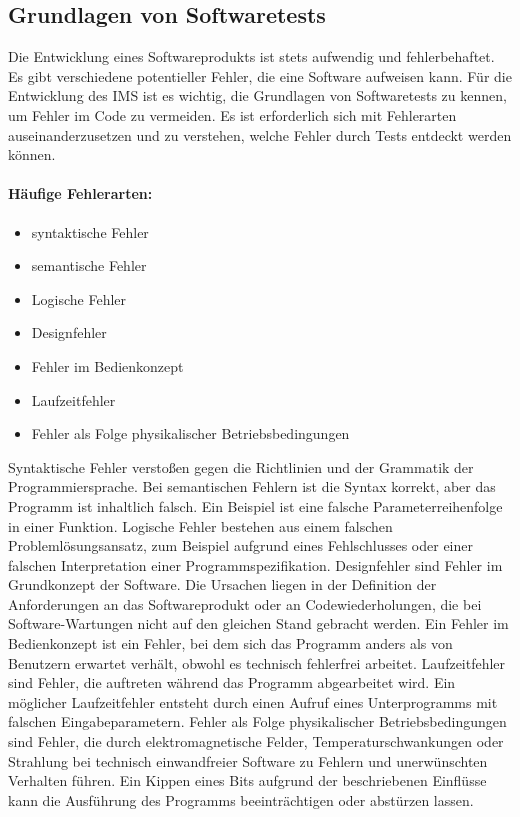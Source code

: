 \documentclass[a4paper,titlepage,halfparskip,12pt]{scrreprt}
\begin{document}
\begin{onehalfspacing}
\pagebreak

\chapter{Grundlagen von Softwaretests}
\label{sec:GrundlagenSoftwaretests}
Die Entwicklung eines Softwareprodukts ist stets aufwendig und fehlerbehaftet. Es gibt verschiedene potentieller Fehler, die eine Software aufweisen kann. Für die Entwicklung des \acs{IMS} ist es wichtig, die Grundlagen von Softwaretests zu kennen, um Fehler im Code zu vermeiden. Es ist erforderlich sich mit Fehlerarten auseinanderzusetzen und zu verstehen, welche Fehler durch Tests entdeckt werden können.

\smallskip

\subsubsection*{Häufige Fehlerarten:}

\smallskip

\begin{itemize}
\item syntaktische Fehler
\item semantische Fehler
\item Logische Fehler
\item Designfehler
\item Fehler im Bedienkonzept
\item Laufzeitfehler
\item Fehler als Folge physikalischer Betriebsbedingungen
\end{itemize}

Syntaktische Fehler verstoßen gegen die Richtlinien und der Grammatik der Programmiersprache. Bei semantischen Fehlern ist die Syntax korrekt, aber das Programm ist inhaltlich falsch. Ein Beispiel ist eine falsche Parameterreihenfolge in einer Funktion. Logische Fehler bestehen aus einem falschen Problemlösungsansatz, zum Beispiel aufgrund eines Fehlschlusses oder einer falschen Interpretation einer Programmspezifikation. Designfehler sind Fehler im Grundkonzept der Software. Die Ursachen liegen in der Definition der Anforderungen an das Softwareprodukt oder an Codewiederholungen, die bei Software-Wartungen nicht auf den gleichen Stand gebracht werden. Ein Fehler im Bedienkonzept ist ein Fehler, bei dem sich das Programm anders als von Benutzern erwartet verhält, obwohl es technisch fehlerfrei arbeitet. Laufzeitfehler sind Fehler, die auftreten während das Programm abgearbeitet wird. Ein möglicher Laufzeitfehler entsteht durch einen Aufruf eines Unterprogramms mit falschen Eingabeparametern. Fehler als Folge physikalischer Betriebsbedingungen sind Fehler, die durch elektromagnetische Felder, Temperaturschwankungen oder Strahlung bei technisch einwandfreier Software zu Fehlern und unerwünschten Verhalten führen. Ein Kippen eines Bits aufgrund der beschriebenen Einflüsse kann die Ausführung des Programms beeinträchtigen oder abstürzen lassen.\cite{witte2019testmanagement}\\


\end{onehalfspacing}
\end{document}
